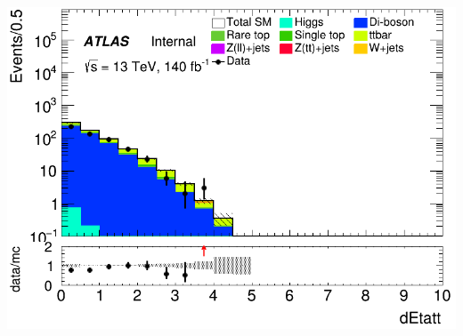 \documentclass[usenames,dvipsnames]{beamer}
\begin{document}
\begin{frame}
    \begin{minipage}{0.32\textwidth}
        \centering
        \includegraphics[width=\textwidth]{graphics/LLL_met/LLL_met_dEtatt.png}
    \end{minipage}
    
    \vspace{0.5cm} %
\end{frame}
\end{document}
